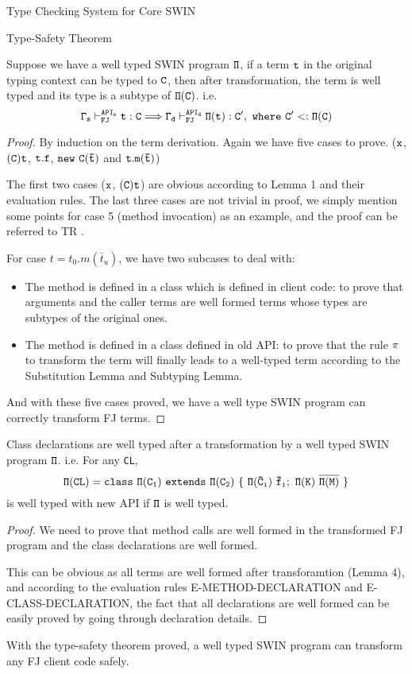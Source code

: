 \begin{section}{Type Checking System for Core SWIN}
\begin{subsection}{Type-Safety Theorem}
\begin{lemma}
Suppose we have a well typed SWIN program $\tt \Pi$, if a term $\tt t$ in the original typing context can be typed to $\tt C$, then after transformation, the term is well typed and its type is a subtype of $\tt \Pi(C)$. i.e.
$$\tt \Gamma_s\vdash^{API_s}_{FJ} t:C \Longrightarrow \Gamma_d\vdash^{API_d}_{FJ} \Pi(t):C',\ where\ C'<:\Pi(C)$$
\end{lemma}
\begin{proof}
By induction on the term derivation. Again we have five cases to prove. ($\tt x$, $\tt(C)t$, $\tt t.f$, $\tt new~C(\bar{t})$ and $\tt t.m(\bar{t})$)

The first two cases ($\tt x$, $\tt (C) t$) are obvious according to Lemma 1 and their evaluation rules.
The last three cases are not trivial in proof, we simply mention some points for case 5 (method invocation) as an example, and the proof can be referred to TR .

For case $t=t_0.m(\bar{t}_u)$, we have two subcases to deal with:
\begin{itemize}
\item The method is defined in a class which is defined in client code: to prove that arguments and the caller terms are well formed terms whose types are subtypes of the original ones.
\item The method is defined in a class defined in old API: to prove that the rule $\tt\pi$ to transform the term will finally leads to a well-typed term according to the Substitution Lemma and Subtyping Lemma.
\end{itemize}

And with these five cases proved, we have a well type SWIN program can correctly transform FJ terms.
\end{proof}

\begin{theorem}
Class declarations are well typed after a transformation by a well typed SWIN program $\tt \Pi$. 
i.e. For any \verb|CL|,
 $$\tt \Pi(CL)= class\ \Pi(C_1)\ extends\ \Pi(C_2)\ \{\ \Pi(\bar{C}_i)\ \bar{f}_i;\ \Pi(K)\  \overline{\Pi(M)}\ \}$$
is well typed with new API if $\tt \Pi$ is well typed.
\end{theorem}
\begin{proof}
We need to prove that method calls are well formed in the transformed FJ program and the class declarations are well formed.

This can be obvious as all terms are well formed after transforamtion (Lemma 4), and according to the evaluation rules E-METHOD-DECLARATION and E-CLASS-DECLARATION, the fact that all declarations are well formed can be easily proved by going through declaration details.
\end{proof}

With the type-safety theorem proved, a well typed SWIN program can transform any FJ client code safely.
\end{subsection}

\end{section}






